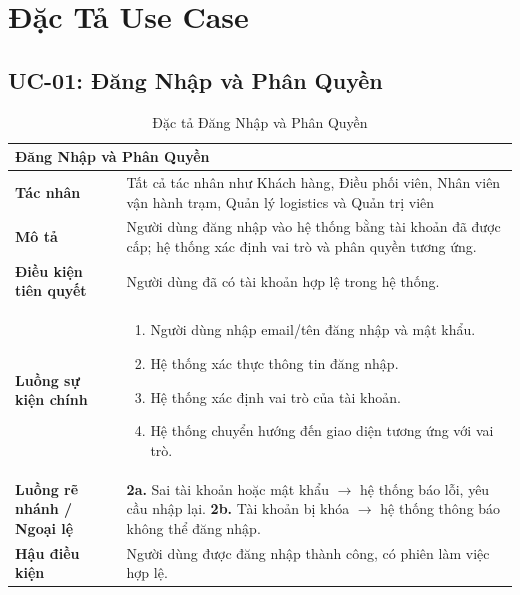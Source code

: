 \section{Đặc Tả Use Case}

\subsection{UC-01: Đăng Nhập và Phân Quyền}
\begin{table}[H]
  \centering
  \begin{tabularx}{\textwidth}{|l|X|}
    \hline
    \multicolumn{2}{|l|}{\textbf{Đăng Nhập và Phân Quyền}} \\
    \hline
    \textbf{Tác nhân}           & Tất cả tác nhân như Khách hàng, Điều phối viên, Nhân viên vận hành trạm, Quản lý logistics và Quản trị viên \\ \hline
    \textbf{Mô tả}              & Người dùng đăng nhập vào hệ thống bằng tài khoản đã được cấp; hệ thống xác định vai trò và phân quyền tương ứng. \\ \hline
    \textbf{Điều kiện tiên quyết} & Người dùng đã có tài khoản hợp lệ trong hệ thống. \\ \hline
    \textbf{Luồng sự kiện chính} &
      \begin{enumerate}[leftmargin=*, nosep, topsep=0pt]
        \item Người dùng nhập email/tên đăng nhập và mật khẩu.
        \item Hệ thống xác thực thông tin đăng nhập.
        \item Hệ thống xác định vai trò của tài khoản.
        \item Hệ thống chuyển hướng đến giao diện tương ứng với vai trò.
      \end{enumerate} \\ \hline
    \textbf{Luồng rẽ nhánh / Ngoại lệ} &
      \textbf{2a.} Sai tài khoản hoặc mật khẩu $\rightarrow$ hệ thống báo lỗi, yêu cầu nhập lại.
      \newline
      \textbf{2b.} Tài khoản bị khóa $\rightarrow$ hệ thống thông báo không thể đăng nhập. \\ \hline
    \textbf{Hậu điều kiện}      & Người dùng được đăng nhập thành công, có phiên làm việc hợp lệ. \\
    \hline
  \end{tabularx}
  \caption{Đặc tả Đăng Nhập và Phân Quyền}
  \label{tab:uc01}
\end{table}


